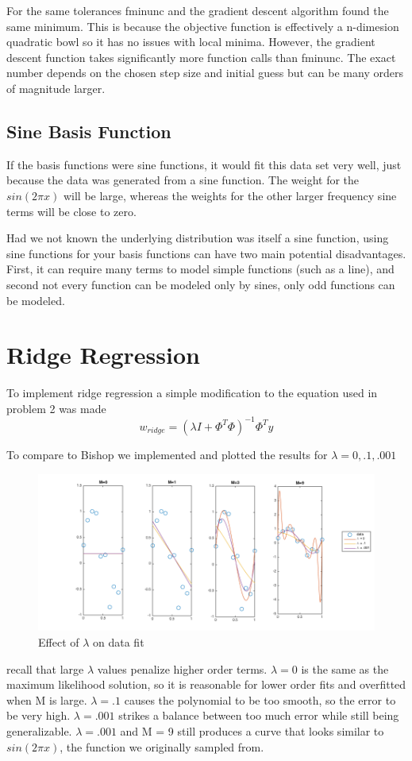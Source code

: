 \documentclass[10pt,twocolumn]{article}
\begin{document}
For the same tolerances fminunc and the gradient descent algorithm found the same minimum. This is because the objective function is effectively a n-dimesion quadratic bowl so it has no issues with local minima. However, the gradient descent function takes significantly more function calls than fminunc. The exact number depends on the chosen step size and initial guess but can be many orders of magnitude larger. 

\subsection*{ Sine Basis Function}
If the basis functions were sine functions, it would fit this data set very well, just because the data was generated from a sine function. The weight for the $sin(2 \pi x)$ will be large, whereas the weights for the other larger frequency sine terms will be close to zero.

Had we not known the underlying distribution was itself a sine function, using sine functions for your basis functions can have two main potential disadvantages. First, it can require many terms to model simple functions (such as a line), and second not every function can be modeled only by sines, only odd functions can be modeled.

\section{Ridge Regression}
To implement ridge regression a simple modification to the equation used in problem 2 was made
\begin{equation}
w_{ridge} = (\lambda I + \Phi^T  \Phi)^{-1}  \Phi^T y
\end{equation}

To compare to Bishop we implemented and plotted the results for $\lambda = {0, .1, .001} $

\begin{figure}[H]
\center
\includegraphics[scale =.3]{rr_lambdas.png}
\caption{Effect of $\lambda$ on data fit}
\end{figure}

recall that large $\lambda$ values penalize higher order terms. $\lambda = 0$ is the same as the maximum likelihood solution, so it is reasonable for lower order fits and overfitted when M is large. $\lambda = .1$ causes the polynomial to be too smooth, so the error to be very high. $\lambda = .001$ strikes a balance between too much error while still being generalizable. $\lambda = .001$ and M = 9 still produces a curve that looks similar to $sin(2\pi x)$, the function we originally sampled from.
\end{document}

